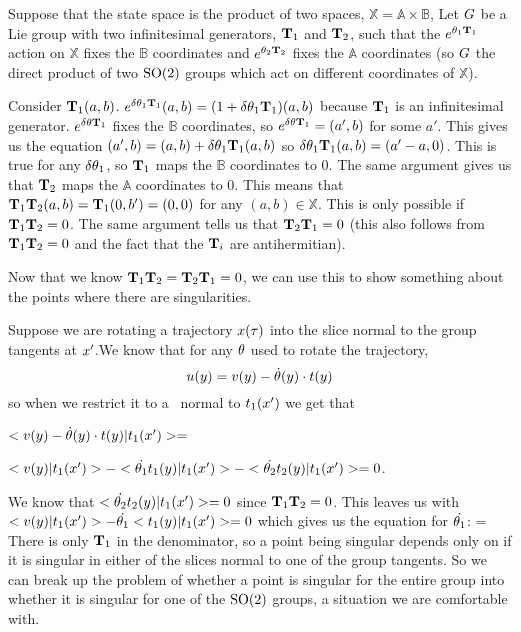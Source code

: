 {Suppose that the state space is the product of two spaces, $\mathbb{X}=\mathbb{A} \times \mathbb{B}$,
Let $G$ be a Lie group with two infinitesimal generators, $\mathbf{T}_1$ and $\mathbf{T}_2$, such that the $e^{{\bf \theta}_1 \mathbf{T}_1}$ action on $\mathbb{X}$ fixes the $\mathbb{B}$ coordinates and $e^{{\bf \theta}_2 \mathbf{T}_2}$ fixes the $\mathbb{A}$ coordinates (so $G$ the direct product of two $\textrm{SO}(2)$ groups which act on different coordinates of $\mathbb{X}$).

Consider $\mathbf{T}_1 (a,b)$. $e^{\delta {\bf \theta}_1 \mathbf{T}_1}(a,b)=(1+\delta {\bf \theta}_1 \mathbf{T}_1) (a,b)$ because $\mathbf{T}_1$ is an infinitesimal generator. $e^{\delta {\bf \theta} \mathbf{T}_1}$ fixes the $\mathbb{B}$ coordinates, so $e^{\delta {\bf \theta} \mathbf{T}_1}=(a',b)$ for some $a'$. This gives us the equation $(a',b)=(a,b)+\delta {\bf \theta}_1 \mathbf{T}_1(a,b)$ so $\delta {\bf \theta}_1 \mathbf{T}_1(a,b)=(a'-a,0)$. This is true for any $\delta {\bf \theta}_1$, so $\mathbf{T}_1$ maps the $\mathbb{B}$ coordinates to 0. The same argument gives us that $\mathbf{T}_2$ maps the $\mathbb{A}$ coordinates to 0. This means that $\mathbf{T}_1 \mathbf{T}_2 (a,b)=\mathbf{T}_1 (0,b')=(0,0)$ for any $(a,b) \in \mathbb{X}$. This is only possible if $\mathbf{T}_1 \mathbf{T}_2=0$. The same argument tells us that $\mathbf{T}_2 \mathbf{T}_1=0$ (this also follows from $\mathbf{T}_1 \mathbf{T}_2=0$ and the fact that the $\mathbf{T}_i$ are antihermitian).

Now that we know $\mathbf{T}_1 \mathbf{T}_2=\mathbf{T}_2 \mathbf{T}_1=0$, we can use this to show something about the points where there are singularities.

Suppose we are rotating a trajectory $x(\tau)$ into the slice normal to the group tangents at $x'$.We know that for any ${\bf \theta}$ used to rotate the trajectory,
\begin{equation*}
u(y) = v(y)-\dot{{\bf \theta}}(y) \cdot t(y)
\end{equation*}
so when we restrict it to a \slice\ normal to $t_1(x')$ we get that

$<v(y)-\dot{{\bf \theta}}(y) \cdot t(y)|t_1(x')>=$

$<v(y)|t_1(x')>-<\dot{{\bf \theta}_1} t_1(y)|t_1(x')>-<\dot{{\bf \theta}_2} t_2(y)|t_1(x')>=0$.

We know that
$<\dot{{\bf \theta}_2} t_2(y)|t_1(x')>=0$ since $\mathbf{T}_1 \mathbf{T}_2=0$.
This leaves us with $<v(y)|t_1(x')>-\dot{{\bf \theta}_1}<t_1(y)|t_1(x')>=0$ which gives us the equation for $\dot{{\bf \theta}_1}$:
\beq
{}=
\eeq
There is only $\mathbf{T}_1$ in the denominator, so a point being singular depends only on if it is singular in either of the slices normal to one of the group tangents. So we can break up the problem of whether a point is singular for the entire group into whether it is singular for one of the $\textrm{SO}(2)$ groups, a situation we are comfortable with.

}
